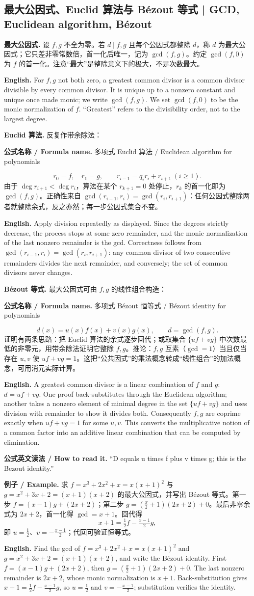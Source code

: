 \documentclass[UTF8,11pt,a4paper]{ctexart}
\newcommand{\EN}[1]{\par\noindent\textbf{English.} #1\par}
\newcommand{\READ}[1]{\par\noindent\textbf{公式英文读法 / How to read it.} #1\par}
\newcommand{\FORMULA}[2]{\par\noindent\textbf{公式名称 / Formula name.} #1 / #2\par}
\newcommand{\EX}[2]{\par\noindent\textbf{例子 / Example.} #1\par\EN{#2}}
\begin{document}
\subsection{最大公因式、Euclid 算法与 Bézout 等式 | GCD, Euclidean algorithm, Bézout}
\noindent\textbf{最大公因式.} 设 $f,g$ 不全为零。若 $d\mid f,g$ 且每个公因式都整除 $d$，称 $d$ 为最大公因式；它只差非零常数倍，首一化后唯一，记为 $\gcd(f,g)$。约定 $\gcd(f,0)$ 为 $f$ 的首一化。注意“最大”是整除意义下的极大，不是次数最大。
\EN{For $f,g$ not both zero, a greatest common divisor is a common divisor divisible by every common divisor. It is unique up to a nonzero constant and unique once made monic; we write $\gcd(f,g)$. We set $\gcd(f,0)$ to be the monic normalization of $f$. ``Greatest'' refers to the divisibility order, not to the largest degree.}
\noindent\textbf{Euclid 算法.} 反复作带余除法：
\FORMULA{多项式 Euclid 算法}{Euclidean algorithm for polynomials}
\[
r_0=f,\quad r_1=g,\qquad r_{i-1}=q_ir_i+r_{i+1}\ (i\ge1).
\]
由于 $\deg r_{i+1}<\deg r_i$，算法在某个 $r_{k+1}=0$ 处停止，$r_k$ 的首一化即为 $\gcd(f,g)$。正确性来自 $\gcd(r_{i-1},r_i)=\gcd(r_i,r_{i+1})$：任何公因式整除两者就整除余式，反之亦然；每一步公因式集合不变。
\EN{Apply division repeatedly as displayed. Since the degrees strictly decrease, the process stops at some zero remainder, and the monic normalization of the last nonzero remainder is the gcd. Correctness follows from $\gcd(r_{i-1},r_i)=\gcd(r_i,r_{i+1})$: any common divisor of two consecutive remainders divides the next remainder, and conversely; the set of common divisors never changes.}
\noindent\textbf{Bézout 等式.} 最大公因式可由 $f,g$ 的线性组合构造：
\FORMULA{多项式 Bézout 恒等式}{Bézout identity for polynomials}
\[
d(x)=u(x)f(x)+v(x)g(x),\qquad d=\gcd(f,g).
\]
证明有两条思路：把 Euclid 算法的余式逐步回代；或取集合 $\{uf+vg\}$ 中次数最低的非零元，用带余除法证明它整除 $f,g$。推论：$f,g$ 互素（$\gcd=1$）当且仅当存在 $u,v$ 使 $uf+vg=1$。这把“公共因式”的乘法概念转成“线性组合”的加法概念，可用消元实际计算。
\EN{A greatest common divisor is a linear combination of $f$ and $g$: $d=uf+vg$. One proof back-substitutes through the Euclidean algorithm; another takes a nonzero element of minimal degree in the set $\{uf+vg\}$ and uses division with remainder to show it divides both. Consequently $f,g$ are coprime exactly when $uf+vg=1$ for some $u,v$. This converts the multiplicative notion of a common factor into an additive linear combination that can be computed by elimination.}
\READ{``D equals u times f plus v times g; this is the Bezout identity.''}
\EX{求 $f=x^3+2x^2+x=x(x+1)^2$ 与 $g=x^2+3x+2=(x+1)(x+2)$ 的最大公因式，并写出 Bézout 等式。第一步 $f=(x-1)g+(2x+2)$；第二步 $g=(\tfrac{x}{2}+1)(2x+2)+0$。最后非零余式为 $2x+2$，首一化得 $\gcd=x+1$。回代得
\[
x+1=\tfrac12 f-\tfrac{x-1}{2}g,
\]
即 $u=\tfrac12$、$v=-\tfrac{x-1}{2}$；代回可验证恒等式。}{Find the gcd of $f=x^3+2x^2+x=x(x+1)^2$ and $g=x^2+3x+2=(x+1)(x+2)$, and write the Bézout identity. First $f=(x-1)g+(2x+2)$, then $g=(\tfrac{x}{2}+1)(2x+2)+0$. The last nonzero remainder is $2x+2$, whose monic normalization is $x+1$. Back-substitution gives $x+1=\tfrac12 f-\tfrac{x-1}{2}g$, so $u=\tfrac12$ and $v=-\tfrac{x-1}{2}$; substitution verifies the identity.}
\end{document}
